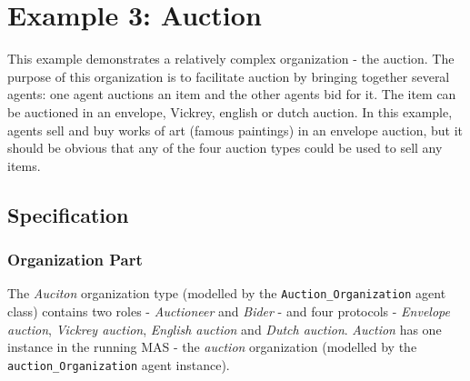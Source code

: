 
\section{Example 3: Auction}

This example demonstrates a relatively complex organization - the auction.
The purpose of this organization is to facilitate auction by bringing together several agents: one agent auctions an item and the other agents bid for it.
The item can be auctioned in an envelope, Vickrey, english or dutch auction.
In this example, agents sell and buy works of art (famous paintings) in an envelope auction, but it should be obvious that any of the four auction types could be used to sell any items.

\subsection*{Specification}

\subsubsection*{Organization Part}

The \textit{Auciton} organization type (modelled by the \texttt{Auction\_Organization} agent class) contains two roles - \textit{Auctioneer} and \textit{Bider} - and four protocols - \textit{Envelope auction}, \textit{Vickrey auction}, \textit{English auction} and \textit{Dutch auction}.
\textit{Auction} has one instance in the running MAS - the \textit{auction} organization (modelled by the \texttt{auction\_Organization} agent instance).

